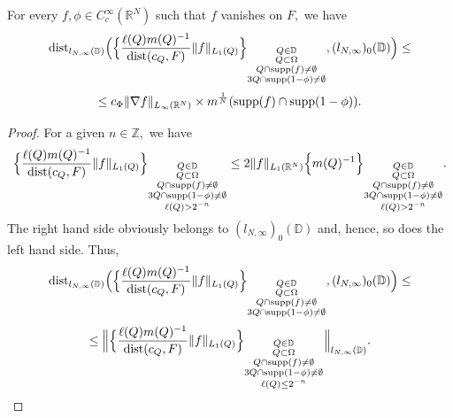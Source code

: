 \documentclass{amsart}
\begin{document}
\begin{lemma}\label{first RS without r convergence lemma} For every $f,\phi\in C^{\infty}_c(\mathbb{R}^N)$ such that $f$ vanishes on $F,$ we have
$${\rm dist}_{l_{N,\infty}(\mathbb{D})}\Big(\Big\{\frac{\ell(Q)m(Q)^{-1}}{{\rm dist}(c_Q,F)}\|f\|_{L_1(Q)}\Big\}_{\substack{Q\in\mathbb{D}\\ Q\subset\Omega\\ Q\cap {\rm supp}(f)\neq\emptyset\\ 3Q\cap {\rm supp}(1-\phi)\neq\emptyset}},(l_{N,\infty})_0(\mathbb{D})\Big)\leq$$
$$\leq c_{\Phi}\|\nabla f\|_{L_{\infty}(\mathbb{R}^N)}\times m^{\frac1N}({\rm supp}(f)\cap{\rm supp}(1-\phi)).$$
\end{lemma}
\begin{proof} For a given $n\in\mathbb{Z},$ we have
$$\Big\{\frac{\ell(Q)m(Q)^{-1}}{{\rm dist}(c_Q,F)}\|f\|_{L_1(Q)}\Big\}_{\substack{Q\in\mathbb{D}\\ Q\subset\Omega\\ Q\cap {\rm supp}(f)\neq\emptyset\\ 3Q\cap {\rm supp}(1-\phi)\neq\emptyset\\ \ell(Q)>2^{-n}}}\leq 2\|f\|_{L_1(\mathbb{R}^N)} \Big\{m(Q)^{-1}\Big\}_{\substack{Q\in\mathbb{D}\\ Q\subset\Omega\\ Q\cap {\rm supp}(f)\neq\emptyset\\ 3Q\cap {\rm supp}(1-\phi)\neq\emptyset\\ \ell(Q)>2^{-n}}}.$$
The right hand side obviously belongs to $(l_{N,\infty})_0(\mathbb{D})$ and, hence, so does the left hand side. Thus,
$${\rm dist}_{l_{N,\infty}(\mathbb{D})}\Big(\Big\{\frac{\ell(Q)m(Q)^{-1}}{{\rm dist}(c_Q,F)}\|f\|_{L_1(Q)}\Big\}_{\substack{Q\in\mathbb{D}\\ Q\subset\Omega\\ Q\cap {\rm supp}(f)\neq\emptyset\\ 3Q\cap {\rm supp}(1-\phi)\neq\emptyset}},(l_{N,\infty})_0(\mathbb{D})\Big)\leq$$
$$\leq\Big\|\Big\{\frac{\ell(Q)m(Q)^{-1}}{{\rm dist}(c_Q,F)}\|f\|_{L_1(Q)}\Big\}_{\substack{Q\in\mathbb{D}\\ Q\subset\Omega\\ Q\cap {\rm supp}(f)\neq\emptyset\\ 3Q\cap {\rm supp}(1-\phi)\neq\emptyset\\ \ell(Q)\leq 2^{-n}}}\Big\|_{l_{N,\infty}(\mathbb{D})}.$$


\end{proof}
\end{document}
